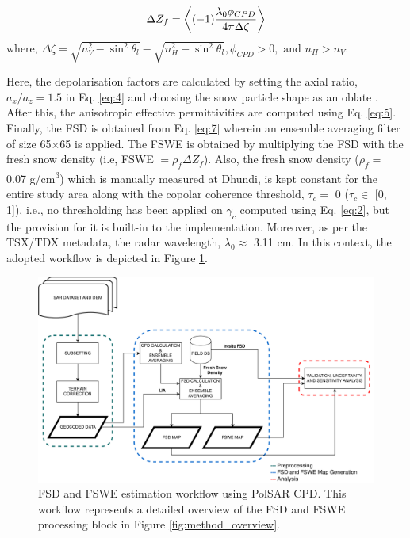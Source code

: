 \documentclass[review]{elsarticle}
\numberwithin{equation}{section}
\numberwithin{figure}{section}
\numberwithin{table}{section}
\begin{document}
\begin{equation}
    \centering
    \label{eq:7}
    \Delta{Z_f} = \left\langle(-1)\frac{\lambda_0\phi_{CPD}}{4\pi\Delta{\zeta}}\right\rangle
\end{equation}
where, $\Delta{\zeta} = \sqrt{n^2_V - \sin^{2}\theta_l} - \sqrt{n^2_H - \sin^{2}\theta_l}, \phi_{CPD} > 0, \text{ and } n_H > n_V$.

Here, the depolarisation factors are calculated by setting the axial ratio, $a_x/a_z = 1.5$ in
Eq. \eqref{eq:4} and choosing the snow particle shape as an oblate \citep{Majumdar2019}. After this, the anisotropic effective permittivities are computed using Eq. \eqref{eq:5}. Finally, the FSD is obtained from Eq. \eqref{eq:7} wherein an ensemble averaging filter of size 65$\times$65 is applied. The FSWE is obtained by multiplying the FSD with the fresh snow density (i.e, FSWE $ = \rho_f\Delta{Z_f}$). Also, the fresh snow density ($\rho_f = $ 0.07 g/cm\textsuperscript{3}) which is manually measured at Dhundi, is kept constant for the entire study area along with the copolar coherence threshold, $\tau_c = $ 0 ($\tau_c \in$ [0, 1]), i.e., no thresholding has been applied on $\gamma_c$ computed using Eq. \eqref{eq:2}, but the provision for it is built-in to the implementation. Moreover, as per the TSX/TDX metadata, the radar wavelength, $\lambda_0 \approx$ 3.11 cm. In this context, the adopted workflow is depicted in Figure \ref{fig:fsd_method}.

\begin{figure}[htb]
    \centering
    \includegraphics[width=\textwidth]{Figures/Methods/FSD_Method.png}
    \caption{FSD and FSWE estimation workflow using PolSAR CPD. This workflow represents a detailed overview of the FSD and FSWE processing block in Figure \ref{fig:method_overview}.}
    \label{fig:fsd_method}
\end{figure}
\end{document}
